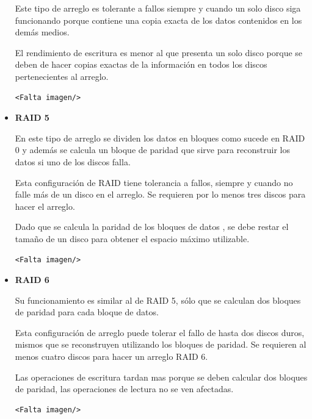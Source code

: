 \begin{itemize}
Este tipo de arreglo es tolerante a fallos siempre y cuando un solo disco siga funcionando porque contiene una copia exacta de los datos contenidos en los dem\'{a}s medios.

El rendimiento de escritura es menor al que presenta un solo disco porque se deben de hacer copias exactas de la informaci\'{o}n en todos los discos pertenecientes al arreglo.

{\large\begin{verbatim}<Falta imagen/>\end{verbatim}}

  \item \textbf{RAID 5}

En este tipo de arreglo se dividen los datos en bloques como sucede en RAID 0 y adem\'{a}s se calcula un bloque de paridad que sirve para reconstruir los datos si uno de los discos falla.

Esta configuraci\'{o}n de RAID tiene tolerancia a fallos, siempre y cuando no falle m\'{a}s de un disco en el arreglo. Se requieren por lo menos tres discos para hacer el arreglo.

Dado que se calcula la paridad de los bloques de datos , se debe restar el tama\~{n}o de un disco para obtener el espacio m\'{a}ximo utilizable.
  
{\large\begin{verbatim}<Falta imagen/>\end{verbatim}}

  \item \textbf{RAID 6}

Su funcionamiento es similar al de RAID 5, s\'{o}lo que se calculan dos bloques de paridad para cada bloque de datos.

Esta configuraci\'{o}n de arreglo puede tolerar el fallo de hasta dos discos duros, mismos que se reconstruyen utilizando los bloques de paridad. Se requieren al menos cuatro discos para hacer un arreglo RAID 6.

Las operaciones de escritura tardan mas porque se deben calcular dos bloques de paridad, las operaciones de lectura no se ven afectadas.
  
{\large\begin{verbatim}<Falta imagen/>\end{verbatim}}
  
\end{itemize}

